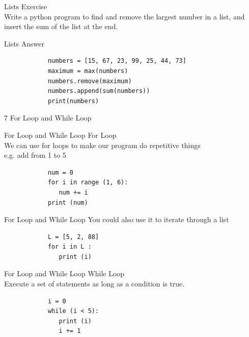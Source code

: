 \documentclass{beamer}
\begin{document}
    \begin{frame}{Lists}
        \color{blue} \Large Exercise \\
        \color{black} \normalsize \vskip 10pt
        Write a python program to find and remove the largest number in 
        a list, and insert the sum of the list at the end.
    \end{frame}

    \begin{frame}[fragile]{Lists}
        \color{blue} \Large Answer \\
        \color{black} \normalsize \vskip 10pt
        \begin{verbatim}
            numbers = [15, 67, 23, 99, 25, 44, 73]
            maximum = max(numbers)
            numbers.remove(maximum)
            numbers.append(sum(numbers))
            print(numbers)
        \end{verbatim}
    \end{frame}
    
    \begin{frame}[plain, c]
        \begin{center}
            \color{blue} \LARGE 7 For Loop and While Loop
        \end{center}
    \end{frame}
    
    \begin{frame}[fragile]{For Loop and While Loop}
        \color{blue} \Large For Loop \\
        \color{black} \normalsize \vskip 5pt
        We can use for loops to make our program do repetitive things \\
        e.g. add from 1 to 5 \\
        \begin{verbatim}
            num = 0
            for i in range (1, 6):
               num += i
            print (num)
        \end{verbatim}
    \end{frame}
    
    \begin{frame}[fragile]{For Loop and While Loop}
        You could also use it to iterate through a list
        \begin{verbatim}
            L = [5, 2, 88]
            for i in L :
               print (i)
        \end{verbatim}
    \end{frame}
    
    \begin{frame}[fragile]{For Loop and While Loop}
        \color{blue} \Large While Loop \\
        \color{black} \normalsize \vskip 5pt
        Execute a set of statements as long as a condition is true.\\
        \begin{verbatim}
            i = 0
            while (i < 5):
               print (i)
               i += 1
        \end{verbatim}
    \end{frame}
    
\end{document}
